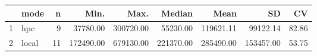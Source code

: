 \begin{table}[ht]
\centering
\begin{tabular}{rlrrrrrrr}
  \hline
 & mode & n & Min. & Max. & Median & Mean & SD & CV \\ 
  \hline
1 & hpc &   9 & 37780.00 & 300720.00 & 55230.00 & 119621.11 & 99122.14 & 82.86 \\ 
  2 & local &  11 & 172490.00 & 679130.00 & 221370.00 & 285490.00 & 153457.00 & 53.75 \\ 
   \hline
\end{tabular}
\end{table}
